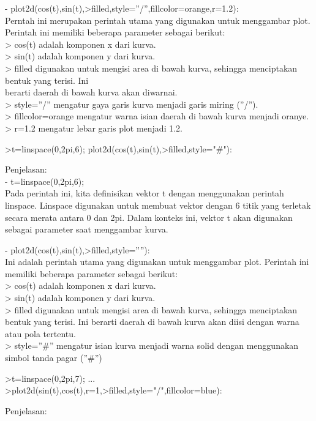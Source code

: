 \documentclass{article}
\begin{document}
\begin{eulernotebook}
\begin{eulercomment}
- plot2d(cos(t),sin(t),\textgreater{}filled,style=”/”,fillcolor=orange,r=1.2):\\
Perntah ini merupakan perintah utama yang digunakan untuk menggambar
plot.\\
Perintah ini memiliki beberapa parameter sebagai berikut:\\
\textgreater{} cos(t) adalah komponen x dari kurva.\\
\textgreater{} sin(t) adalah komponen y dari kurva.\\
\textgreater{} filled digunakan untuk mengisi area di bawah kurva, sehingga
menciptakan bentuk yang terisi. Ini\\
berarti daerah di bawah kurva akan diwarnai.\\
\textgreater{} style=”/” mengatur gaya garis kurva menjadi garis miring (”/”).\\
\textgreater{} fillcolor=orange mengatur warna isian daerah di bawah kurva menjadi
oranye.\\
\textgreater{} r=1.2 mengatur lebar garis plot menjadi 1.2.
\end{eulercomment}
\begin{eulerprompt}
>t=linspace(0,2pi,6); plot2d(cos(t),sin(t),>filled,style="#"):
\end{eulerprompt}
\begin{eulercomment}
Penjelasan:\\
- t=linspace(0,2pi,6);\\
Pada perintah ini, kita definisikan vektor t dengan menggunakan
perintah linspace. Linspace digunakan untuk membuat vektor dengan 6
titik yang terletak secara merata antara 0 dan 2pi. Dalam konteks ini,
vektor t akan digunakan sebagai parameter saat menggambar kurva.

- plot2d(cos(t),sin(t),\textgreater{}filled,style=””):\\
Ini adalah perintah utama yang digunakan untuk menggambar plot.
Perintah ini memiliki beberapa parameter sebagai berikut:\\
\textgreater{} cos(t) adalah komponen x dari kurva.\\
\textgreater{} sin(t) adalah komponen y dari kurva.\\
\textgreater{} filled digunakan untuk mengisi area di bawah kurva, sehingga
menciptakan bentuk yang terisi. Ini berarti daerah di bawah kurva akan
diisi dengan warna atau pola tertentu.\\
\textgreater{} style=”#” mengatur isian kurva menjadi warna solid dengan
menggunakan simbol tanda pagar (”#”)
\end{eulercomment}
\begin{eulerprompt}
>t=linspace(0,2pi,7); ...
>plot2d(sin(t),cos(t),r=1,>filled,style="/",fillcolor=blue):
\end{eulerprompt}
\begin{eulercomment}
Penjelasan:


\end{eulercomment}
\end{eulernotebook}
\end{document}
